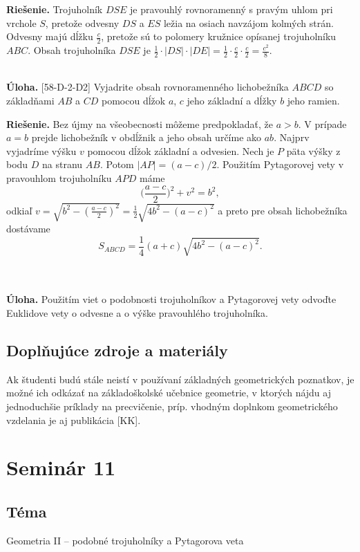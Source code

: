 \documentclass[11pt,a4paper,oneside,final]{book}
\newcommand{\ul}{\textbf{Úloha.} }
\newcommand{\rie}{\textbf{Riešenie.} }
\begin{document}
\rie Trojuholník $DSE$ je pravouhlý rovnoramenný s pravým uhlom pri vrchole $S$, pretože odvesny $DS$ a $ES$ ležia na osiach navzájom kolmých strán. Odvesny majú dĺžku $\frac{c}{2}$, pretože sú to polomery kružnice opísanej trojuholníku $ABC$. Obsah trojuholníka $DSE$ je $\frac{1}{2}\cdot|DS|\cdot |DE|=\frac{1}{2}\cdot \frac{c}{2}\cdot\frac{c}{2}=\frac{c^2}{8}.$ \\
\\
\begin{tcolorbox}[breakable,notitle,boxrule=0pt,colback=light-gray,colframe=light-gray]\ul [58-D-2-D2] Vyjadrite obsah rovnoramenného lichobežníka $ABCD$ so základňami $AB$ a $CD$ pomocou dĺžok $a$, $c$ jeho základní a dĺžky $b$ jeho ramien.

\end{tcolorbox}

\rie Bez újmy na všeobecnosti môžeme predpokladať, že $a>b$. V prípade $a=b$ prejde lichobežník v obdĺžnik a jeho obsah určíme ako $ab$. Najprv vyjadríme výšku $v$ pomocou dĺžok základní a odvesien. Nech je $P$ päta výšky z bodu $D$ na stranu $AB$. Potom $|AP|=(a-c)/2$. Použitím Pytagorovej vety v pravouhlom trojuholníku $APD$ máme
$$\bigg(\frac{a-c}{2}\bigg)^2+v^2=b^2,$$
odkiaľ $v=\sqrt{b^2-(\frac{a-c}{2})^2}=\frac{1}{2}\sqrt{4b^2-(a-c)^2}$ a preto pre obsah lichobežníka dostávame $$S_{ABCD}=\frac{1}{4}(a+c)\sqrt{4b^2-(a-c)^2}.$$\\
\\
\begin{tcolorbox}[breakable,notitle,boxrule=0pt,colback=light-gray,colframe=light-gray]\ul Použitím viet o podobnosti trojuholníkov a Pytagorovej vety odvoďte Euklidove vety o odvesne a o výške pravouhlého trojuholníka.
\end{tcolorbox}

\subsection*{Doplňujúce zdroje a materiály}
Ak študenti budú stále neistí v používaní základných geometrických poznatkov, je možné ich odkázať na základoškolské učebnice geometrie, v ktorých nájdu aj jednoduchšie príklady na precvičenie, príp. vhodným doplnkom geometrického vzdelania je aj publikácia [KK].
\newpage
\section*{Seminár 11}
\subsection*{Téma}
Geometria II -- podobné trojuholníky a Pytagorova veta
\end{document}
